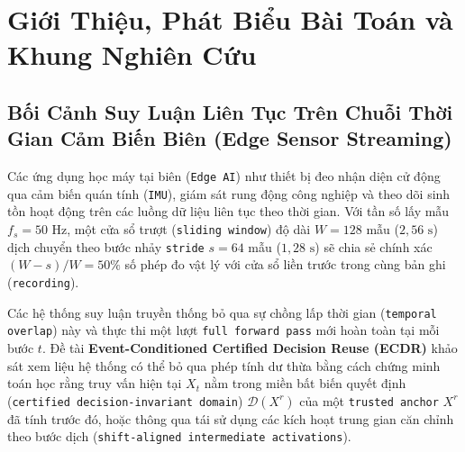 \documentclass[11pt,a4paper]{article}
\newcommand{\code}[1]{{\small\ttfamily\nolinkurl{#1}}}
\newcommand{\Dset}{\mathcal{D}}
\theoremstyle{remark}
\begin{document}
\section{Giới Thiệu, Phát Biểu Bài Toán và Khung Nghiên Cứu}

\subsection{Bối Cảnh Suy Luận Liên Tục Trên Chuỗi Thời Gian Cảm Biến Biên (Edge Sensor Streaming)}
Các ứng dụng học máy tại biên (\code{Edge AI}) như thiết bị đeo nhận diện cử động qua cảm biến quán tính (\code{IMU}), giám sát rung động công nghiệp và theo dõi sinh tồn hoạt động trên các luồng dữ liệu liên tục theo thời gian. Với tần số lấy mẫu $f_s = 50\text{ Hz}$, một cửa sổ trượt (\code{sliding window}) độ dài $W = 128$ mẫu ($2,56\text{ s}$) dịch chuyển theo bước nhảy \code{stride} $s = 64$ mẫu ($1,28\text{ s}$) sẽ chia sẻ chính xác $(W - s)/W = 50\%$ số phép đo vật lý với cửa sổ liền trước trong cùng bản ghi (\code{recording}).

Các hệ thống suy luận truyền thống bỏ qua sự chồng lấp thời gian (\code{temporal overlap}) này và thực thi một lượt \code{full forward pass} mới hoàn toàn tại mỗi bước $t$. Đề tài \textbf{Event-Conditioned Certified Decision Reuse (ECDR)} khảo sát xem liệu hệ thống có thể bỏ qua phép tính dư thừa bằng cách chứng minh toán học rằng truy vấn hiện tại $X_t$ nằm trong miền bất biến quyết định (\code{certified decision-invariant domain}) $\Dset(X^r)$ của một \code{trusted anchor} $X^r$ đã tính trước đó, hoặc thông qua tái sử dụng các kích hoạt trung gian căn chỉnh theo bước dịch (\code{shift-aligned intermediate activations}).
\end{document}
